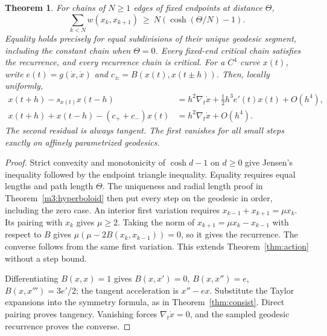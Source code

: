 \documentclass[11pt,reqno]{amsart}
\newtheorem{theorem}{Theorem}[section]
\theoremstyle{definition}
\theoremstyle{remark}
\numberwithin{equation}{section}
\begin{document}
\begin{theorem}\label{m3:action}
For chains of \(N\ge1\) edges of fixed endpoints at distance \(\Theta\),
\[
 \sum_{k<N} w(x_k,x_{k+1})\ \ge\ N(\cosh(\Theta/N)-1).
\]
Equality holds precisely for equal subdivisions of their unique
geodesic segment, including the constant chain when \(\Theta=0\).
Every fixed-end critical chain satisfies the recurrence, and every
recurrence chain is critical.
For a \(C^4\) curve \(x(t)\), write \(e(t)=g(\dot x,\dot x)\)
and \(c_\pm=B(x(t),x(t\pm h))\). Then, locally uniformly,
\[
 \begin{split}
 x(t+h)-s_{x(t)}x(t-h)&=h^2\nabla_t\dot x+\tfrac12h^3e'(t)x(t)+O(h^4),\\
 x(t+h)+x(t-h)-(c_++c_-)x(t)&=h^2\nabla_t\dot x+O(h^4).
 \end{split}
\]
The second residual is always tangent. The first vanishes for all
small steps exactly on affinely parametrized geodesics.
\end{theorem}
\begin{proof}
Strict convexity and monotonicity of \(\cosh d-1\) on \(d\ge0\)
give Jensen's inequality followed by the endpoint triangle
inequality. Equality requires equal lengths and path length
\(\Theta\). The uniqueness and radial length proof in
Theorem~\ref{m3:hyperboloid} then put every step on the geodesic
in order, including the zero case. An interior first variation
requires \(x_{k-1}+x_{k+1}=\mu x_k\). Its pairing with \(x_k\)
gives \(\mu\ge2\). Taking the norm of
\(x_{k+1}=\mu x_k-x_{k-1}\) with respect to \(B\) gives
\(\mu(\mu-2B(x_k,x_{k-1}))=0\), so it gives the recurrence.
The converse follows from the same first variation. This extends
Theorem~\ref{thm:action} without a step bound.

Differentiating \(B(x,x)=1\) gives \(B(x,x')=0\),
\(B(x,x'')=e\), \(B(x,x''')=3e'/2\); the tangent acceleration is
\(x''-ex\). Substitute the Taylor expansions into the symmetry formula,
as in Theorem~\ref{thm:consist}. Direct pairing proves tangency.
Vanishing forces \(\nabla_t\dot x=0\), and the sampled geodesic
recurrence proves the converse.
\end{proof}
\end{document}
